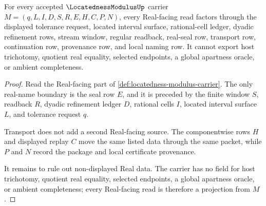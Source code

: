 \begin{theorem}
\label{thm:locatedness-modulus-real-seal-non-escape}
For every accepted $\LocatednessModulusUp$ carrier $M=(q,L,I,D,S,R,E,H,C,P,N)$, every Real-facing read factors through the displayed tolerance request, located interval surface, rational-cell ledger, dyadic refinement rows, stream window, regular readback, real-seal row, transport row, continuation row, provenance row, and local naming row. It cannot export host trichotomy, quotient real equality, selected endpoints, a global apartness oracle, or ambient completeness.
\end{theorem}
\begin{proof}
Read the Real-facing part of \autoref{def:locatedness-modulus-carrier}. The only real-name boundary is the seal row $E$, and it is preceded by the finite window $S$, readback $R$, dyadic refinement ledger $D$, rational cells $I$, located interval surface $L$, and tolerance request $q$.

Transport does not add a second Real-facing source. The componentwise rows $H$ and displayed replay $C$ move the same listed data through the same packet, while $P$ and $N$ record the package and local certificate provenance.

It remains to rule out non-displayed Real data. The carrier has no field for host trichotomy, quotient real equality, selected endpoints, a global apartness oracle, or ambient completeness; every Real-facing read is therefore a projection from $M$.
\end{proof}

